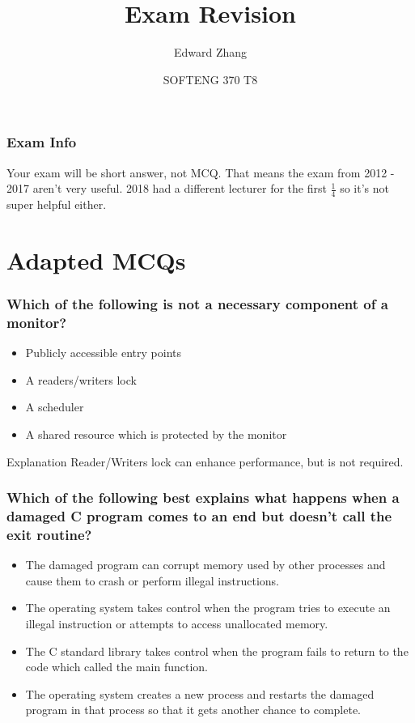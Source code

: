 \documentclass{beamer}
\title[SOFTENG 370 Tutorial 9 (2019)] %
{Exam Revision}
\author{Edward Zhang}
\date[October 2019] %
{SOFTENG 370 T8}
\begin{document}
\frame{\titlepage}
\begin{frame}
  \frametitle{Exam Info}
  Your exam will be short answer, not MCQ. That means the exam from 2012 - 2017 aren't very useful. 2018 had a different lecturer for the first $\frac{1}{4}$ so it's not super helpful either.\\
\end{frame}
\section{Adapted MCQs}
\begin{frame}
  \frametitle{Which of the following is not a necessary component of a monitor?}
  \begin{itemize}
    \item Publicly accessible entry points
    \item<alert@2> A readers/writers lock
    \item A scheduler
    \item A shared resource which is protected by the monitor
  \end{itemize}
  \pause
  \begin{block}{Explanation}
    Reader/Writers lock can enhance performance, but is not required.
  \end{block}
\end{frame}
\begin{frame}
  \frametitle{Which of the following best explains what happens when a damaged C program comes to an end but doesn’t call the exit routine?}
  \begin{itemize}
    \item The damaged program can corrupt memory used by other processes and cause them to crash or perform illegal instructions.
    \item<alert@2> The operating system takes control when the program tries to execute an illegal instruction or attempts to access unallocated memory.
    \item The C standard library takes control when the program fails to return to the code which called the main function.
    \item The operating system creates a new process and restarts the damaged program in that process so that it gets another chance to complete.
  \end{itemize}
\end{frame}
\end{document}
